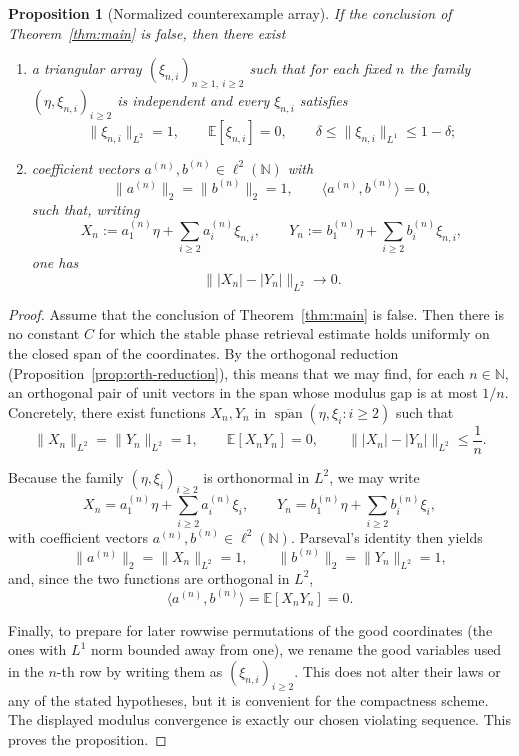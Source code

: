 \documentclass[11pt]{amsart}
\numberwithin{equation}{section}
\newtheorem{proposition}[theorem]{Proposition}
\theoremstyle{definition}
\theoremstyle{remark}
\newcommand{\E}{\mathbb E}
\newcommand{\N}{\mathbb N}
\newcommand{\Span}{\operatorname{span}}
\newcommand{\abs}[1]{\lvert #1 \rvert}
\newcommand{\norm}[1]{\lVert #1 \rVert}
\newcommand{\ip}[2]{\langle #1,#2\rangle}
\begin{document}
\begin{proposition}[Normalized counterexample array]\label{prop:counterexample}
If the conclusion of Theorem~\ref{thm:main} is false, then there exist
\begin{enumerate}[label=\rm(\roman*)]
\item a triangular array $(\xi_{n,i})_{n\ge1,\ i\ge2}$ such that for each
fixed $n$ the family $(\eta,\xi_{n,i})_{i\ge2}$ is independent and every
$\xi_{n,i}$ satisfies
\[
\norm{\xi_{n,i}}_{L^2}=1,
\qquad
\E[\xi_{n,i}]=0,
\qquad
\delta\le \norm{\xi_{n,i}}_{L^1}\le 1-\delta;
\]
\item coefficient vectors $a^{(n)},b^{(n)}\in \ell^2(\N)$ with
\[
\norm{a^{(n)}}_2=\norm{b^{(n)}}_2=1,
\qquad
\ip{a^{(n)}}{b^{(n)}}=0,
\]
such that, writing
\[
X_n:=a_1^{(n)}\eta+\sum_{i\ge2} a_i^{(n)}\xi_{n,i},
\qquad
Y_n:=b_1^{(n)}\eta+\sum_{i\ge2} b_i^{(n)}\xi_{n,i},
\]
one has
\[
\norm{\abs{X_n}-\abs{Y_n}}_{L^2}\longrightarrow 0.
\]
\end{enumerate}
\end{proposition}

\begin{proof}
Assume that the conclusion of Theorem~\ref{thm:main} is false.  Then there is
no constant $C$ for which the stable phase retrieval estimate holds uniformly
on the closed span of the coordinates.  By the orthogonal reduction
(Proposition~\ref{prop:orth-reduction}), this means that we may find, for each
$n\in\N$, an orthogonal pair of unit vectors in the span whose modulus gap is
at most $1/n$.  Concretely, there exist functions $X_n,Y_n$ in
$\overline{\Span}(\eta,\xi_i:i\ge2)$ such that
\[
\norm{X_n}_{L^2}=\norm{Y_n}_{L^2}=1,
\qquad
\E[X_nY_n]=0,
\qquad
\norm{|X_n|-|Y_n|}_{L^2}\le \frac1n.
\]

\noindent Because the family $(\eta,\xi_i)_{i\ge2}$ is orthonormal in $L^2$, we may write
\[
X_n=a_1^{(n)}\eta+\sum_{i\ge2}a_i^{(n)}\xi_i,
\qquad
Y_n=b_1^{(n)}\eta+\sum_{i\ge2}b_i^{(n)}\xi_i,
\]
with coefficient vectors $a^{(n)},b^{(n)}\in\ell^2(\N)$.  Parseval's identity
then yields
\[
\norm{a^{(n)}}_2=\norm{X_n}_{L^2}=1,
\qquad
\norm{b^{(n)}}_2=\norm{Y_n}_{L^2}=1,
\]
and, since the two functions are orthogonal in $L^2$,
\[
\ip{a^{(n)}}{b^{(n)}}=\E[X_nY_n]=0.
\]

Finally, to prepare for later rowwise permutations of the good coordinates (the ones with $L^1$ norm bounded away from one), we
rename the good variables used in the $n$-th row by writing them as
$(\xi_{n,i})_{i\ge2}$.  This does not alter their laws or any of the stated
hypotheses, but it is convenient for the compactness scheme.  The displayed
modulus convergence is exactly our chosen violating sequence.  This proves the
proposition.
\end{proof}
\end{document}
